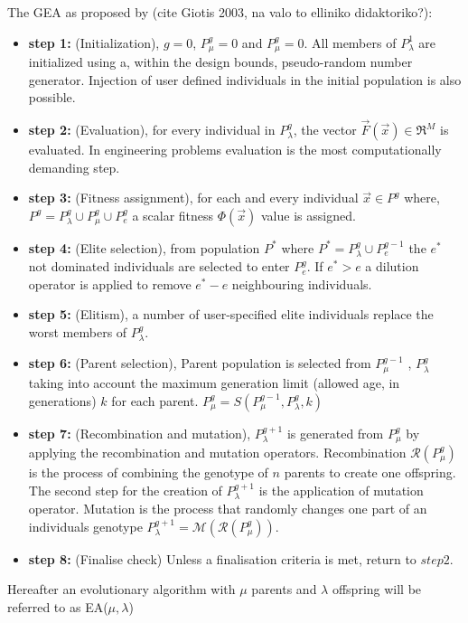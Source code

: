 The GEA as proposed by (cite Giotis 2003, na valo to elliniko didaktoriko?):
\begin{itemize}
\item[]{\bf step 1:}  (Initialization), $g=0$, $P_{\mu}^g=0$ and $P_{\mu}^g=0$. All members of $P_{\lambda}^1$ are initialized using a, within the design bounds,  pseudo-random number generator. Injection of user defined individuals in the initial population is also possible. 
\item[]{\bf step 2:}  (Evaluation), for every individual in $P_{\lambda}^g$, the vector $\vec{F}(\vec{x}) \in \Re^{M} $ is evaluated. In engineering problems evaluation is the most computationally demanding step.
\item[]{\bf step 3:}  (Fitness assignment), for each and every individual $\vec{x} \in P^g$ where, $P^g = P_{\lambda}^g \cup P_{\mu}^g \cup P_{e}^g$ a scalar fitness $\Phi(\vec{x})$ value is assigned.
\item[]{\bf step 4:}  (Elite selection), from population $P^*$ where $P^*=P_{\lambda}^g \cup P_{e}^{g-1}$ the $e^*$ not dominated individuals are selected to enter $P_e^g$. If $e^* > e$ a dilution operator is applied to remove $e^* - e$ neighbouring individuals.     
\item[]{\bf step 5:}  (Elitism), a number of user-specified elite individuals replace the worst members of $P_{\lambda}^g$.  
\item[]{\bf step 6:}  (Parent selection), Parent population is selected from $P_{\mu}^{g-1}$ , $P_{\lambda}^g$ taking into account the maximum generation limit (allowed age, in generations) $k$ for each parent. $P_{\mu}^{g}=S(P_{\mu}^{g-1},P_{\lambda}^g,k)$ 
\item[]{\bf step 7:}  (Recombination and mutation), $P_{\lambda}^{g+1}$ is generated from 
$P_{\mu}^{g}$  by applying the recombination and mutation operators. Recombination $\mathcal{R}(P_{\mu}^{g})$ is the process of combining the genotype of $n$ parents to create one offspring. The second step for the creation of $P_{\lambda}^{g+1}$ is the application of mutation operator. Mutation is the process that randomly changes one part of an individuals genotype $P_{\lambda}^{g+1} = \mathcal{M}(\mathcal{R}(P_{\mu}^{g}))$.
\item[]{\bf step 8:}  (Finalise check) Unless a finalisation criteria is met, return to $step 2$.
\end{itemize}
Hereafter an evolutionary algorithm with $\mu$ parents and $\lambda$ offspring will be referred to as EA($\mu,\lambda$)   

